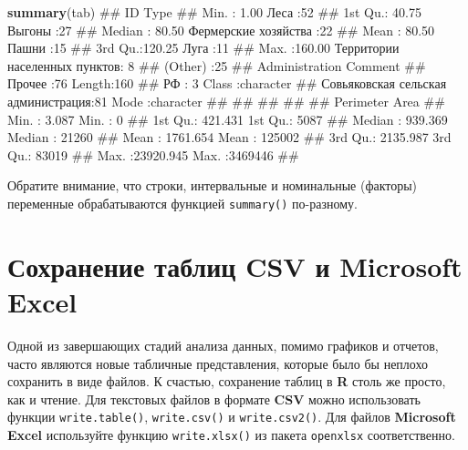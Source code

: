 \documentclass[]{book}
\newenvironment{Shaded}{\begin{snugshade}}{\end{snugshade}}
\newcommand{\KeywordTok}[1]{\textcolor[rgb]{0.13,0.29,0.53}{\textbf{#1}}}
\newcommand{\NormalTok}[1]{#1}
\begin{document}
\begin{Shaded}
\begin{Highlighting}[]
\KeywordTok{summary}\NormalTok{(tab)}
\NormalTok{##        ID                                    Type   }
\NormalTok{##  Min.   :  1.00   Леса                         :52  }
\NormalTok{##  1st Qu.: 40.75   Выгоны                       :27  }
\NormalTok{##  Median : 80.50   Фермерские хозяйства         :22  }
\NormalTok{##  Mean   : 80.50   Пашни                        :15  }
\NormalTok{##  3rd Qu.:120.25   Луга                         :11  }
\NormalTok{##  Max.   :160.00   Территории населенных пунктов: 8  }
\NormalTok{##                   (Other)                      :25  }
\NormalTok{##                              Administration   Comment         }
\NormalTok{##  Прочее                             :76     Length:160        }
\NormalTok{##  РФ                                 : 3     Class :character  }
\NormalTok{##  Совьяковская сельская администрация:81     Mode  :character  }
\NormalTok{##                                                               }
\NormalTok{##                                                               }
\NormalTok{##                                                               }
\NormalTok{##                                                               }
\NormalTok{##    Perimeter              Area        }
\NormalTok{##  Min.   :    3.087   Min.   :      0  }
\NormalTok{##  1st Qu.:  421.431   1st Qu.:   5087  }
\NormalTok{##  Median :  939.369   Median :  21260  }
\NormalTok{##  Mean   : 1761.654   Mean   : 125002  }
\NormalTok{##  3rd Qu.: 2135.987   3rd Qu.:  83019  }
\NormalTok{##  Max.   :23920.945   Max.   :3469446  }
\NormalTok{## }
\end{Highlighting}
\end{Shaded}

Обратите внимание, что строки, интервальные и номинальные (факторы)
переменные обрабатываются функцией \texttt{summary()} по-разному.

\section{Сохранение таблиц CSV и Microsoft Excel}\label{table_writing}

Одной из завершающих стадий анализа данных, помимо графиков и отчетов,
часто являются новые табличные представления, которые было бы неплохо
сохранить в виде файлов. К счастью, сохранение таблиц в \textbf{R} столь
же просто, как и чтение. Для текстовых файлов в формате \textbf{CSV}
можно использовать функции \texttt{write.table()}, \texttt{write.csv()}
и \texttt{write.csv2()}. Для файлов \textbf{Microsoft Excel} используйте
функцию \texttt{write.xlsx()} из пакета \texttt{openxlsx}
соответственно.
\end{document}
